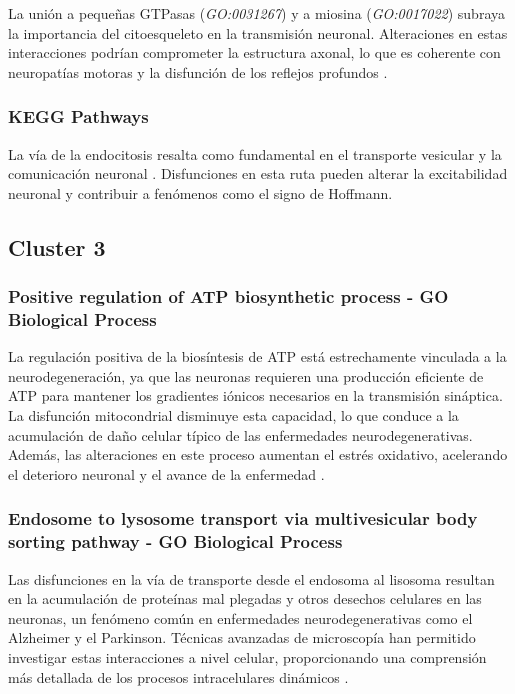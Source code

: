 La unión a pequeñas GTPasas (\textit{GO:0031267}) y a miosina (\textit{GO:0017022}) subraya la importancia del citoesqueleto en la transmisión neuronal. Alteraciones en estas interacciones podrían comprometer la estructura axonal, lo que es coherente con neuropatías motoras y la disfunción de los reflejos profundos \cite{GUO2020133}.

\subsubsection{KEGG Pathways}

La vía de la endocitosis resalta como fundamental en el transporte vesicular y la comunicación neuronal \cite{Chanaday8209}. Disfunciones en esta ruta pueden alterar la excitabilidad neuronal y contribuir a fenómenos como el signo de Hoffmann.


\subsection{Cluster 3}

\subsubsection{Positive regulation of ATP biosynthetic process - GO Biological Process}
La regulación positiva de la biosíntesis de ATP está estrechamente vinculada a la neurodegeneración, ya que las neuronas requieren una producción eficiente de ATP para mantener los gradientes iónicos necesarios en la transmisión sináptica. La disfunción mitocondrial disminuye esta capacidad, lo que conduce a la acumulación de daño celular típico de las enfermedades neurodegenerativas. Además, las alteraciones en este proceso aumentan el estrés oxidativo, acelerando el deterioro neuronal y el avance de la enfermedad \cite{Bonvento2017}.


\subsubsection{Endosome to lysosome transport via multivesicular body sorting pathway - GO Biological Process}
Las disfunciones en la vía de transporte desde el endosoma al lisosoma resultan en la acumulación de proteínas mal plegadas y otros desechos celulares en las neuronas, un fenómeno común en enfermedades neurodegenerativas como el Alzheimer y el Parkinson. Técnicas avanzadas de microscopía han permitido investigar estas interacciones a nivel celular, proporcionando una comprensión más detallada de los procesos intracelulares dinámicos \cite{Mulligan2023}.

